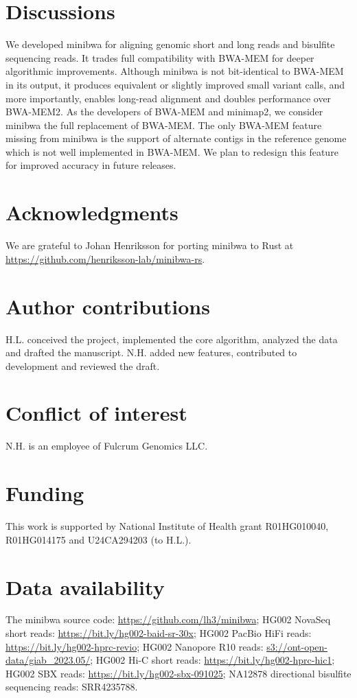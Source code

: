 \documentclass[webpdf,contemporary,large,namedate]{oup-authoring-template}%
\begin{document}
\section{Discussions}

We developed minibwa for aligning genomic short and long reads and bisulfite sequencing reads.
It trades full compatibility with BWA-MEM for deeper algorithmic improvements.
Although minibwa is not bit-identical to BWA-MEM in its output,
it produces equivalent or slightly improved small variant calls,
and more importantly, enables long-read alignment and doubles performance over BWA-MEM2.
As the developers of BWA-MEM and minimap2, we consider minibwa the full replacement of BWA-MEM.
The only BWA-MEM feature missing from minibwa is the support of alternate contigs in the reference genome
which is not well implemented in BWA-MEM.
We plan to redesign this feature for improved accuracy in future releases.

\section*{Acknowledgments}

We are grateful to Johan Henriksson for porting minibwa to Rust at \url{https://github.com/henriksson-lab/minibwa-rs}.

\section*{Author contributions}

H.L. conceived the project, implemented the core algorithm, analyzed the data and drafted the manuscript.
N.H. added new features, contributed to development and reviewed the draft.

\section*{Conflict of interest}

N.H. is an employee of Fulcrum Genomics LLC.

\section*{Funding}

This work is supported by National Institute of Health grant R01HG010040, R01HG014175 and U24CA294203 (to H.L.).

\section*{Data availability}

The minibwa source code: \url{https://github.com/lh3/minibwa};
HG002 NovaSeq short reads: \url{https://bit.ly/hg002-baid-sr-30x};
HG002 PacBio HiFi reads: \url{https://bit.ly/hg002-hprc-revio};
HG002 Nanopore R10 reads: \url{s3://ont-open-data/giab\_2023.05/};
HG002 Hi-C short reads: \url{https://bit.ly/hg002-hprc-hic1};
HG002 SBX reads: \url{https://bit.ly/hg002-sbx-091025};
NA12878 directional bisulfite sequencing reads: SRR4235788.


{\sffamily\small
}
\end{document}
